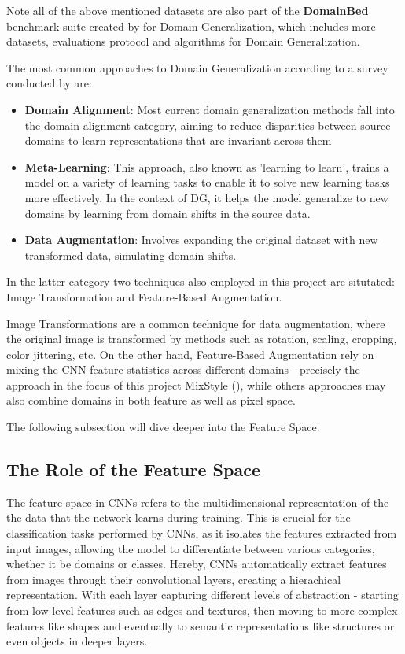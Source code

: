 Note all of the above mentioned datasets are also part of the \textbf{DomainBed} benchmark suite created by \cite{gulrajaniSearchLostDomain2020} for Domain Generalization, which includes more datasets, evaluations protocol and algorithms for Domain Generalization.

The most common approaches to Domain Generalization according to a survey conducted by \cite{zhouDomainGeneralizationSurvey2022} are: %
\begin{itemize}
 \item \textbf{Domain Alignment}: Most current domain generalization methods fall into the domain alignment category, aiming to reduce disparities between source domains to learn representations that are invariant across them
 \item \textbf{Meta-Learning}: This approach, also known as 'learning to learn', trains a model on a variety of learning tasks to enable it to solve new learning tasks more effectively. In the context of DG, it helps the model generalize to new domains by learning from domain shifts in the source data.
 \item \textbf{Data Augmentation}: Involves expanding the original dataset with new transformed data, simulating domain shifts.
\end{itemize}

In the latter category two techniques also employed in this project are situtated:
Image Transformation and Feature-Based Augmentation.

Image Transformations are a common technique for data augmentation, where the original image is transformed by methods such as rotation, scaling, cropping, color jittering, etc.
On the other hand, Feature-Based Augmentation rely on mixing the CNN feature statistics across different domains - precisely the approach in the focus of this project MixStyle (\cite{zhouMixStyleNeuralNetworks2023}), while others approaches may also combine domains in both feature as well as pixel space.

The following subsection will dive deeper into the Feature Space.
\subsection{The Role of the Feature Space}
The feature space in CNNs refers to the multidimensional representation of the the data that the network learns during training. This is crucial for the classification tasks performed by CNNs, as it isolates the features extracted from input images, allowing the model to differentiate between various categories, whether it be domains or classes.
Hereby, CNNs automatically extract features from images through their convolutional layers, creating a hierachical representation. With each layer capturing different levels of abstraction - starting from low-level features such as edges and textures, then moving to more complex features like shapes and eventually to semantic representations like structures or even objects in deeper layers. \cite{zeilerVisualizingUnderstandingConvolutional2013,goodfellowDeepLearning2016}

